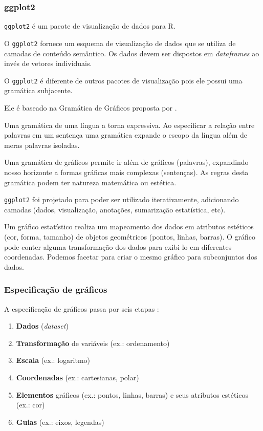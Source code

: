 \begin{frame}[allowframebreaks]
\frametitle{ggplot2}
\texttt{ggplot2} é um pacote de visualização de dados para R.

\vspace{3ex}
O \texttt{ggplot2} fornece um esquema de visualização de dados que se
utiliza de camadas de conteúdo semântico. Os dados devem ser dispostos em \emph{dataframes} 
ao invés de vetores individuais.

\framebreak 

O \texttt{ggplot2} é diferente de outros pacotes de visualização pois ele
possui uma gramática subjacente.

\vspace{3ex}
Ele é baseado na Gramática de Gráficos proposta por \textcite{wilkinson2005grammar}.

\vspace{3ex}
Uma gramática de uma língua a torna expressiva. Ao especificar a relação entre palavras em um sentença
uma gramática expande o escopo da língua além de meras palavras isoladas.

\vspace{3ex}
Uma gramática de gráficos permite ir além de gráficos (palavras), expandindo nosso horizonte a formas
gráficas mais complexas (sentenças). As regras desta gramática podem ter natureza matemática ou estética.


\vspace{3ex}
\texttt{ggplot2} foi projetado para poder ser utilizado iterativamente, adicionando camadas (dados, visualização, anotações, sumarização estatística, etc).

\vspace{3ex}
Um gráfico estatístico realiza um mapeamento dos dados em atributos estéticos (cor, forma, tamanho) de objetos geométricos (pontos, linhas, barras).
O gráfico pode conter alguma transformação dos dados para exibi-lo em diferentes coordenadas.
Podemos facetar para criar o mesmo gráfico para subconjuntos dos dados.
\end{frame}


\begin{frame}
\frametitle{Especificação de gráficos}

A especificação de gráficos passa por seis etapas \cite{wilkinson2005grammar}:
\begin{enumerate}
\item \textbf{Dados} (\emph{dataset})
\item \textbf{Transformação} de variáveis (ex.: ordenamento)
\item \textbf{Escala} (ex.: logaritmo)
\item \textbf{Coordenadas} (ex.: cartesianas, polar)
\item \textbf{Elementos} gráficos (ex.: pontos, linhas, barras) e seus atributos estéticos (ex.: cor)
\item \textbf{Guias} (ex.: eixos, legendas)
\end{enumerate}

\end{frame}

